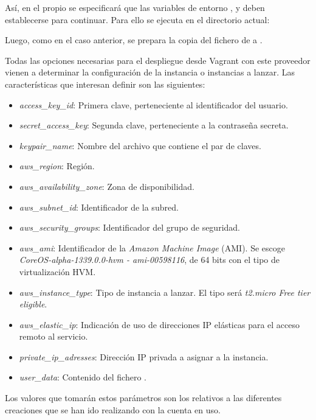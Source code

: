 Así, en el propio  se especificará que las variables de entorno ,  y  deben establecerse para continuar. Para ello se ejecuta en el directorio actual:


Luego, como en el caso anterior, se prepara la copia del fichero  de  a .

Todas las opciones necesarias para el despliegue desde Vagrant con este proveedor vienen a determinar la configuración de la instancia o instancias a lanzar. Las características que interesan definir son las siguientes:
\begin{itemize}
\item \textit{access\_key\_id}: Primera clave, perteneciente al identificador del usuario.
\item \textit{secret\_access\_key}: Segunda clave, perteneciente a la contraseña secreta.
\item \textit{keypair\_name}: Nombre del archivo que contiene el par de claves.
\item \textit{aws\_region}: Región.
\item \textit{aws\_availability\_zone}: Zona de disponibilidad.
\item \textit{aws\_subnet\_id}: Identificador de la subred.
\item \textit{aws\_security\_groups}: Identificador del grupo de seguridad.
\item \textit{aws\_ami}: Identificador de la \textit{Amazon Machine Image} (AMI). Se escoge \textit{CoreOS-alpha-1339.0.0-hvm - ami-00598116}, de 64 bits con el tipo de virtualización HVM.
\item \textit{aws\_instance\_type}: Tipo de instancia a lanzar. El tipo será \textit{t2.micro Free tier eligible}.
\item \textit{aws\_elastic\_ip}: Indicación de uso de direcciones IP elásticas para el acceso remoto al servicio.
\item \textit{private\_ip\_adresses}: Dirección IP privada a asignar a la instancia.
\item \textit{user\_data}: Contenido del fichero .
\end{itemize}

Los valores que tomarán estos parámetros son los relativos a las diferentes creaciones que se han ido realizando con la cuenta en uso.

